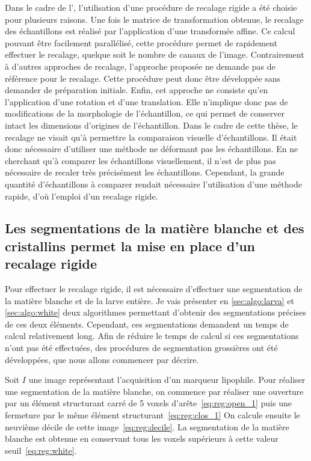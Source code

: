 \documentclass[\main/main.tex]{subfiles}
\begin{document}
%
Dans le cadre de l'\hca{}, l'utilisation d'une procédure de recalage rigide a été choisie pour plusieurs raisons.
%
Une fois le matrice de transformation obtenue, le recalage des échantillons est réalisé par l'application d'une transformée affine.
%
Ce calcul pouvant être facilement parallélisé, cette procédure permet de rapidement effectuer le recalage, quelque soit le nombre de canaux de l'image.
%
Contrairement à d'autres approches de recalage, l'approche proposée ne demande pas de référence pour le recalage.
%
Cette procédure peut donc être développée sans demander de préparation initiale.
%
Enfin, cet approche ne consiste qu'en l'application d'une rotation et d'une translation.
%
Elle n'implique donc pas de modifications de la morphologie de l'échantillon, ce qui permet de conserver intact les dimensions d'origines de l'échantillon.
%
Dans le cadre de cette thèse, le recalage ne visait qu'à permettre la comparaison visuelle d'échantillons.
%
Il était donc nécessaire d'utiliser une méthode ne déformant pas les échantillons.
%
En ne cherchant qu'à comparer les échantillons visuellement, il n'est de plus pas nécessaire de recaler très précisément les échantillons.
%
Cependant, la grande quantité d'échantillons à comparer rendait nécessaire l'utilisation d'une méthode rapide, d'où l'emploi d'un recalage rigide.

\subsection{Les segmentations de la matière blanche et des cristallins permet la mise en place d'un recalage rigide}

Pour effectuer le recalage rigide, il est nécessaire d'effectuer une segmentation de la matière blanche et de la larve entière.
%
Je vais présenter en \autoref{sec:algo:larva} et \autoref{sec:algo:white} deux algorithmes permettant d'obtenir des segmentations précises de ces deux éléments.
%
Cependant, ces segmentations demandent un temps de calcul relativement long.
%
Afin de réduire le temps de calcul si ces segmentations n'ont pas été effectuées, des procédures de segmentation grossières ont été développées, que nous allons commencer par décrire.

%
Soit $I$ une image représentant l'acquisition d'un marqueur lipophile.
%
Pour réaliser une segmentation de la matière blanche, on commence par réaliser une ouverture par un élément structurant carré de 5 voxels d'arête~\eqref{eq:reg:open_1} puis une fermeture par le même élément structurant~\eqref{eq:reg:clos_1}
%
On calcule ensuite le neuvième décile de cette image~\eqref{eq:reg:decile}.
%
La segmentation de la matière blanche est obtenue en conservant tous les voxels supérieurs à cette valeur seuil~\eqref{eq:reg:white}.
\end{document}
